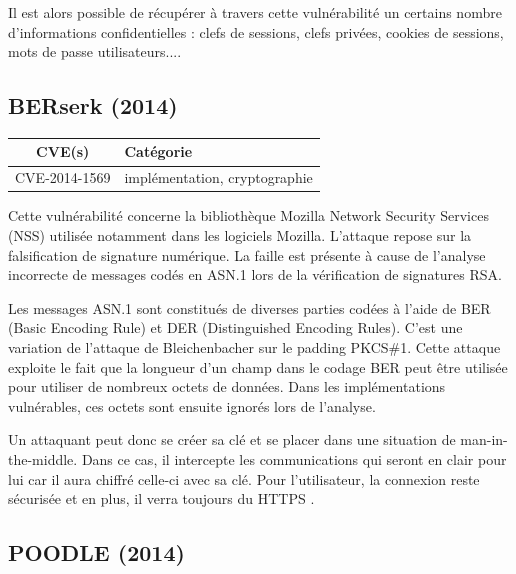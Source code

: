 Il est alors possible de récupérer à travers cette vulnérabilité un certains nombre d'informations confidentielles : clefs de sessions, clefs privées, cookies de sessions, mots de passe utilisateurs...\cite{heartbleed}.




\subsection{BERserk (2014)}

\begin{tabularx}{0.96\textwidth}{|c|X|}
  \hline
  \textbf{CVE(s)} & \textbf{Catégorie} \\
  \hline
  CVE-2014-1569 & implémentation, cryptographie \\
  \hline
\end{tabularx}

\vspace{1em}

Cette vulnérabilité concerne la bibliothèque Mozilla Network Security Services (NSS) utilisée notamment dans les logiciels Mozilla. L'attaque repose sur la falsification de signature numérique. La faille est présente à cause de l'analyse incorrecte de messages codés en ASN.1 lors de la vérification de signatures RSA.

Les messages ASN.1 sont constitués de diverses parties codées à l'aide de BER (Basic Encoding Rule) et DER (Distinguished Encoding Rules). C'est une variation de l'attaque de Bleichenbacher sur le padding PKCS\#1. Cette attaque exploite le fait que la longueur d'un champ dans le codage BER peut être utilisée pour utiliser de nombreux octets de données. Dans les implémentations vulnérables, ces octets sont ensuite ignorés lors de l'analyse.

Un attaquant peut donc se créer sa clé et se placer dans une situation de man-in-the-middle. Dans ce cas, il intercepte les communications qui seront en clair pour lui car il aura chiffré celle-ci avec sa clé. Pour l'utilisateur, la connexion reste sécurisée et en plus, il verra toujours du HTTPS \cite{berserk}.




\subsection{POODLE (2014)}

